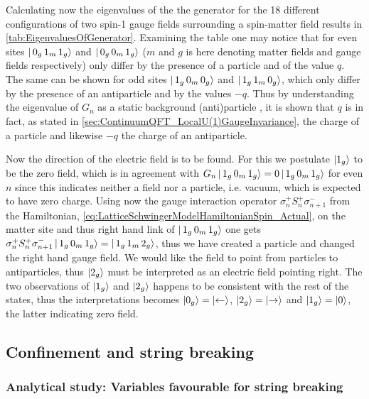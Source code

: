 \documentclass[../main.tex]{subfiles} %
\begin{document}
%
Calculating now the eigenvalues of the the generator for the 18 different configurations of two spin-1 gauge fields surrounding a spin-\half matter field results in \cref{tab:EigenvaluesOfGenerator}. Examining the table one may notice that for even sites $\ket{\, 0_g\, 1_m\, 1_g}$ and $\ket{\, 0_g\, 0_m\, 1_g}$ ($m$ and $g$ is here denoting matter fields and gauge fields respectively) only differ by the presence of a particle and of the value $q$. The same can be shown for odd sites $\ket{\, 1_g\, 0_m\, 0_g}$ and $\ket{\, 1_g\, 1_m\, 0_g}$, which only differ by the presence of an antiparticle and by the values $-q$. Thus by understanding the eigenvalue of $G_n$ as a static background (anti)particle \cite{panyella_masterThesis_2019}, it is shown that $q$ is in fact, as stated in \cref{sec:ContinuumQFT_LocalU(1)GaugeInvariance}, the charge of a particle and likewise $-q$ the charge of an antiparticle.

Now the direction of the electric field is to be found. For this we postulate $\ket{1_g}$ to be the zero field, which is in agreement with $G_n \ket{\, 1_g\, 0_m\, 1_g} = 0 \ket{\, 1_g\, 0_m\, 1_g}$ for even $n$ since this indicates neither a field nor a particle, i.e. vacuum, which is expected to have zero charge. Using now the gauge interaction operator $\sigma_n^+ S_n^+ \sigma_{n+1}^-$ from the Hamiltonian, \cref{eq:LatticeSchwingerModelHamiltonianSpin_Actual}, on the matter site and thus right hand link of $\ket{\, 1_g\, 0_m\, 1_g}$ one gets $\sigma_n^+ S_n^+ \sigma_{n+1}^- \ket{\, 1_g\, 0_m\, 1_g} = \ket{\, 1_g\, 1_m\, 2_g}$, thus we have created a particle and changed the right hand gauge field. We would like the field to point from particles to antiparticles, thus $\ket{2_g}$ must be interpreted as an electric field pointing right. The two observations of $\ket{1_g}$ and $\ket{2_g}$ happens to be consistent with the rest of the states, thus the interpretations becomes $\ket{0_g} = \ket{\leftarrow}$, $\ket{2_g} = \ket{\rightarrow}$ and $\ket{1_g} = \ket{0}$, the latter indicating zero field.



\subsection{Confinement and string breaking} \label{sec:ConfienementAndStringBreakingAnalyticalAndNumerical}

\subsubsection{Analytical study: Variables favourable for string breaking}
\end{document}
